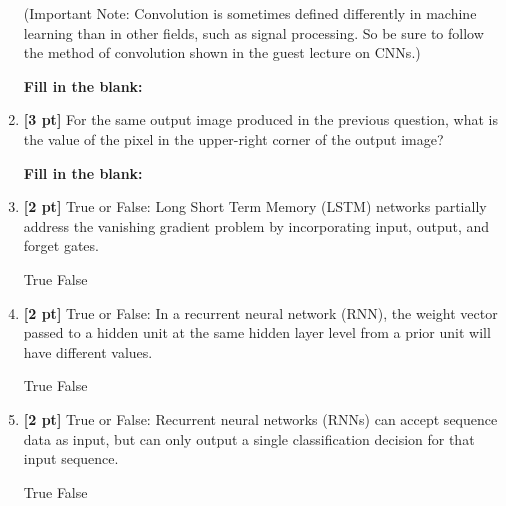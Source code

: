 \documentclass[12pt,addpoints,answers]{exam}
\begin{document}
\begin{enumerate}
    
    (Important Note: Convolution is sometimes defined differently in machine learning than in other fields, such as signal processing. So be sure to follow the method of convolution shown in the guest lecture on CNNs.)
    
        \textbf{Fill in the blank:}
    
    \begin{tcolorbox}[fit,height=1cm, width=4cm, blank, borderline={1pt}{-2pt},nobeforeafter]
    
    \end{tcolorbox}   
    
    
    \item {\textbf{[3 pt]}} For the same output image produced in the previous question, what is the value of the pixel in the upper-right corner of the output image?
    
        \textbf{Fill in the blank:}
    
    \begin{tcolorbox}[fit,height=1cm, width=4cm, blank, borderline={1pt}{-2pt},nobeforeafter]
    
    \end{tcolorbox}   
    
    
    \item {\textbf{[2 pt]}} True or False: Long Short Term Memory (LSTM) networks partially address the vanishing gradient problem by incorporating input, output, and forget gates.
        \begin{checkboxes}
            \choice True
            \choice False
        \end{checkboxes}
    
    
    \item {\textbf{[2 pt]}} True or False: In a recurrent neural network (RNN), the weight vector passed to a hidden unit at the same hidden layer level from a prior unit will have different values.
        \begin{checkboxes}
            \choice True
            \choice False
        \end{checkboxes}
    
    \clearpage
    
    \item {\textbf{[2 pt]}} True or False: Recurrent neural networks (RNNs) can accept sequence data as input, but can only output a single classification decision for that input sequence.
        \begin{checkboxes}
            \choice True
            \choice False
        \end{checkboxes}
    

\end{enumerate}
\end{document}
